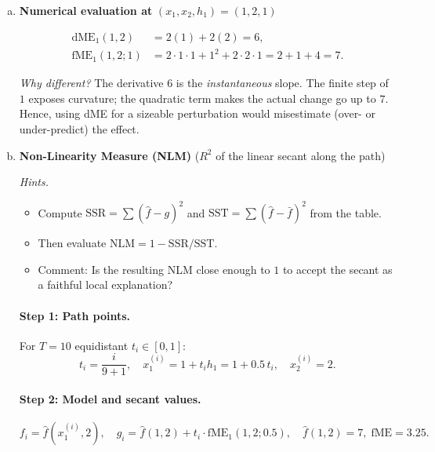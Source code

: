 {\begin{enumerate}[a)]

\item \textbf{Numerical evaluation at} \((x_1,x_2,h_1)=(1,2,1)\)

\[
\begin{aligned}
  \text{dME}_1(1,2) &= 2(1)+2(2)=6,\\[0.2em]
  \text{fME}_1(1,2;1) &= 2 \cdot 1 \cdot 1 + 1^2 + 2 \cdot 2 \cdot 1 =2+1+4=7.
\end{aligned}
\]

\emph{Why different?}  
The derivative \(6\) is the \emph{instantaneous} slope.  
The finite step of \(1\) exposes curvature; the quadratic term makes the actual change go up to \(7\).  
Hence, using dME for a sizeable perturbation would misestimate (over- or under-predict) the effect.

\item \textbf{Non-Linearity Measure (NLM)}  
(\(R^2\) of the linear secant along the path)

\textit{Hints.}
\begin{itemize}\setlength\itemsep{0.2em}
  \item Compute $\text{SSR}=\sum(\hat f - g)^2$ and
        $\text{SST}=\sum(\hat f -\bar f)^2$ from the table.
  \item Then evaluate $\mathrm{NLM}=1-\mathrm{SSR}/\mathrm{SST}$.
  \item Comment: Is the resulting NLM close enough to $1$ to accept the
        secant as a faithful local explanation?
\end{itemize}

\paragraph{Step 1: Path points.}  
For \(T=10\) equidistant \(t_i\in[0,1]\):
\[
  t_i=\frac{i}{9+1}, \quad
  x_1^{(i)} = 1 + t_i h_1 = 1+0.5\,t_i, \quad
  x_2^{(i)} = 2.
\]

\paragraph{Step 2: Model and secant values.}
\[
  f_i = \hat f(x_1^{(i)},2), 
  \quad
  g_i = \hat f(1,2) + t_i\cdot \text{fME}_1(1,2;0.5),
  \quad
  \hat f(1,2)=7,\;
  \text{fME}=3.25.
\]


\end{enumerate}}
